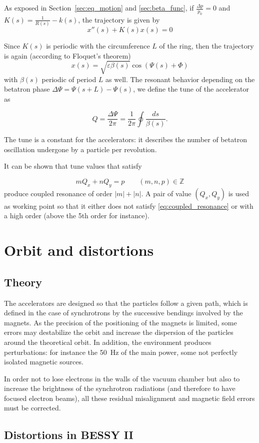 As exposed in Section~\ref{sec:eq_motion} and \ref{sec:beta_func}, if $\frac{\Delta p}{p_0} = 0$ and $K(s)=\frac{1}{R(s)}-k(s)$, the trajectory is given by
\begin{equation}
x''(s)+K(s) x(s) = 0
\end{equation}

Since $K(s)$ is periodic with the circumference $L$ of the ring, then the trajectory is again (according to Floquet's theorem)
\begin{equation}
x(s) = \sqrt{\varepsilon \beta(s)} \cos\left(\Psi(s)+\Phi\right)
\end{equation}
with $\beta(s)$ periodic of period $L$ as well. The resonant behavior depending on the betatron phase $\Delta \Psi = \Psi(s+L)-\Psi(s)$, we define the tune of the accelerator as

\begin{equation}
\label{eq:tune}
Q = \frac{\Delta \Psi}{2 \pi} = \frac{1}{2 \pi} \oint\frac{ds}{\beta(s)}.
\end{equation}

The tune is a constant for the accelerators: it describes the number of betatron oscillation undergone by a particle per revolution.

It can be shown that tune values that satisfy 

\begin{equation}
\label{eq:coupled_resonance}
m Q_x + n Q_y = p \qquad (m, n, p) \in \mathbb{Z}
\end{equation}
produce coupled resonance of order $|m|+|n|$. A pair of value $(Q_x,Q_y)$ is used as working point so that it either does not satisfy \eqref{eq:coupled_resonance} or with a high order (above the 5th order for instance).


\section{Orbit and distortions}
\subsection{Theory}
The accelerators are designed so that the particles follow a given path, which is defined in the case of synchrotrons by the successive bendings involved by the magnets. As the precision of the positioning of the magnets is limited, some errors may destabilize the orbit and increase the dispersion of the particles around the theoretical orbit. In addition, the environment produces perturbations: for instance the 50~Hz of the main power, some not perfectly isolated magnetic sources.

In order not to lose electrons in the walls of the vacuum chamber but also to increase the brightness of the synchrotron radiations (and therefore to have focused electron beams), all these residual misalignment and magnetic field errors must be corrected.

\subsection{Distortions in BESSY II}


